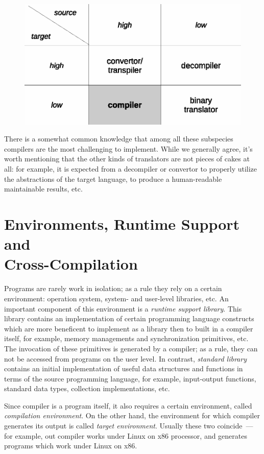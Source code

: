 \begin{figure}[h]
  \centering
  \includegraphics[scale=0.7]{images/01-05.eps}
\end{figure}

There is a somewhat common knowledge that among all these subspecies compilers are the most challenging to implement. While
we generally agree, it's worth mentioning that the other kinds of translators are not pieces of cakes at all: for example,
it is expected from a decompiler or convertor to properly utilize the abstractions of the target language, to produce a
human-readable maintainable results, etc.

\section{Environments, Runtime Support and\\
  Cross-Compilation}

Programs are rarely work in isolation; as a rule they rely on a certain environment: operation system, system- and user-level
libraries, etc. An important component of this environment is a \emph{runtime support library}. This library contains
an implementation of certain programming language constructs which are more beneficent to implement as a
library then to built in a compiler itself, for example, memory managements and synchronization primitives, etc. The
invocation of these primitives is generated by a compiler; as a rule, they can not be accessed from programs on the user level.
In contrast, \emph{standard library} contains an initial implementation of useful data structures and functions
in terms of the source programming language, for example, input-output functions, standard data types, collection implementations, etc.

Since compiler is a program itself, it also requires a certain environment, called \emph{compilation environment}.
On the other hand, the environment for which compiler generates its output is called \emph{target environment}. Usually these two
coincide~--- for example, out \lama compiler works under Linux on x86 processor, and generates programs which work
under Linux on x86.


